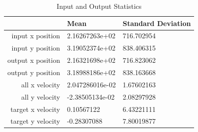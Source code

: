 \documentclass{article}
\begin{document}
\begin{table}[H]
  \caption{Input and Output Statistics }
  \label{Training Loss}
  \centering
  \begin{tabular}{rll}
    \toprule
    \cmidrule(r){1-2}
                           & Mean                     & Standard Deviation      \\
    \midrule
    input x position       & 2.16267263e+02           & 716.702954            \\
    input y position       & 3.19052374e+02           & 838.406315            \\
    output x position      & 2.16321698e+02           & 716.823062            \\
    output y position      & 3.18988186e+02           & 838.163668            \\
    all x velocity         & 2.047286016e-02          & 1.67602163            \\
    all y velocity         & -2.38505134e-02          & 2.08297928            \\
    target x velocity      & 0.10567122               & 6.43221111            \\
    target y velocity      & -0.28307088              & 7.80019877            \\
    \bottomrule
  \end{tabular}
\end{table}
\end{document}
